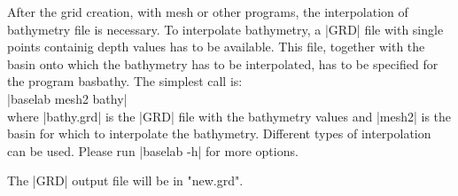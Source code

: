 

After the grid creation, with mesh or other programs, the interpolation
of bathymetry file is necessary.
To interpolate bathymetry, a |GRD| file with single points containig
depth values has to be available. This file, together with the basin
onto which the bathymetry has to be interpolated, has to be specified
for the program basbathy. The simplest call is: \\

        |baselab mesh2 bathy|\\

where |bathy.grd| is the |GRD| file with the bathymetry values and
|mesh2| is the basin for which to interpolate the bathymetry.
Different types of interpolation can be used. Please run
|baselab -h| for more options.

The |GRD| output file will be in "new.grd".\\



%


